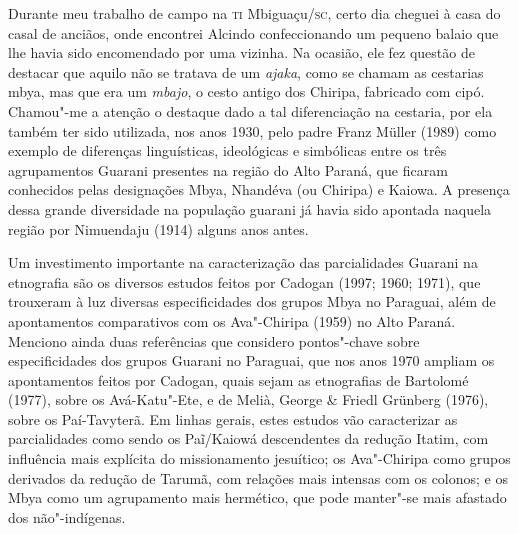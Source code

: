  


Durante meu trabalho de campo na \textsc{ti} Mbiguaçu/\textsc{sc}, certo dia cheguei à
casa do casal de anciãos, onde encontrei Alcindo confeccionando um
pequeno balaio que lhe havia sido encomendado por uma vizinha. Na
ocasião, ele fez questão de destacar que aquilo não se tratava de um
\emph{ajaka}, como se chamam as cestarias mbya, mas que era um \emph{mbajo}, o cesto
antigo dos Chiripa, fabricado com cipó. Chamou"-me a atenção o destaque
dado a tal diferenciação na cestaria, por ela também ter sido
utilizada, nos anos 1930, pelo padre Franz Müller (1989) como exemplo
de diferenças linguísticas, ideológicas e simbólicas entre os três
agrupamentos Guarani presentes na região do Alto Paraná, que ficaram
conhecidos pelas designações Mbya, Nhandéva (ou Chiripa) e Kaiowa. A
presença dessa grande diversidade na população guarani já havia sido
apontada naquela região por Nimuendaju (1914) alguns anos antes.

Um investimento importante na caracterização das parcialidades Guarani
na etnografia são os diversos estudos feitos por Cadogan (1997;
1960; 1971), que trouxeram à luz diversas
especificidades dos grupos Mbya no Paraguai, além de apontamentos
comparativos com os Ava"-Chiripa (1959) no Alto Paraná. Menciono ainda
duas referências que considero pontos"-chave sobre
especificidades dos grupos Guarani no Paraguai, que nos anos 1970
ampliam os apontamentos feitos por Cadogan, quais sejam as etnografias
de Bartolomé (1977), sobre os Avá-Katu"-Ete, e de Melià,
George \& Friedl Grünberg (1976), sobre os Paí-Tavyterã. Em linhas
gerais, estes estudos vão caracterizar as parcialidades como sendo os
Paĩ/Kaiowá descendentes da redução
Itatim, com influência mais explícita do missionamento jesuítico; os
Ava"-Chiripa como grupos derivados da redução de Tarumã, com relações
mais intensas com os colonos; e os Mbya como um agrupamento mais
hermético, que pode manter"-se mais afastado dos não"-indígenas. 

